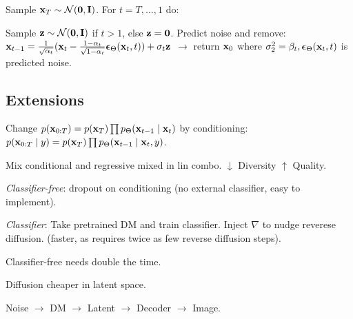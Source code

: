 \begin{definition}[Sampling]
    Sample \(\vb{x}_T \sim \operatorname{\mathcal{N}}(\vb{0}, \vb{I})\). For \(t = T, \ldots, 1\) do:
    
    Sample \(\vb{z} \sim \operatorname{\mathcal{N}}(\vb{0}, \vb{I})\) if \(t > 1\), else \(\vb{z} = \vb{0}\). Predict noise and remove: \(\vb{x}_{t-1} = \frac{1}{\sqrt{\alpha_t}}(\vb{x}_t - \frac{1 - \alpha_t}{\sqrt{1 - \alpha_t}}\vb*{\epsilon}_{\Theta}(\vb{x}_t, t)) + \sigma_t \vb{z}\) \(\to\) return \(\vb{x}_0\) where
    \(\sigma_2^2 = \beta_t, \vb*{\epsilon}_{\Theta}(\vb{x}_t, t)\) is predicted noise.
\end{definition}

\subsection{Extensions}
\begin{definition}[Conditional]
    Change \(p(\vb{x}_{0:T}) = p(\vb{x}_T)\prod p_{\Theta}(\vb{x}_{t-1} \mid \vb{x}_t)\) by conditioning: \(p(\vb{x}_{0:T} \mid y) = p(\vb{x}_T)\prod p_{\Theta}(\vb{x}_{t-1} \mid \vb{x}_t, y)\).
\end{definition}

\begin{definition}[Guidance]
    Mix conditional and regressive mixed in lin combo.
    \(\downarrow\) Diversity \(\uparrow\) Quality.
    \begin{itemize*}
        \item \textit{Classifier-free}: dropout on conditioning (no external classifier, easy to implement).
        \item \textit{Classifier}: Take pretrained DM and train classifier. Inject \(\nabla\) to nudge reverese diffusion. (faster, as requires twice as few reverse diffusion steps).
    \end{itemize*}
    Classifier-free needs double the time.
\end{definition}

\begin{definition}
    Diffusion cheaper in latent space.

    Noise \(\to\) DM \(\to\) Latent \(\to\) Decoder \(\to\) Image.
\end{definition}

